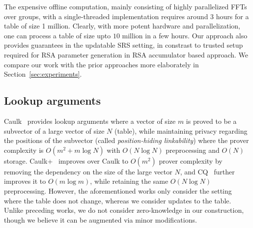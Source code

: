 The expensive offline computation, mainly consisting of highly parallelized FFTs over groups, with a single-threaded implementation requires around $3$ hours for a
table of size 1 million. 
Clearly, with more potent hardware and
parallelization, one can process a table of size upto $10$ million in a few hours. 
Our approach also provides guarantees in the updatable SRS setting, in constrast to trusted setup required for RSA parameter generation in RSA accumulator based approach.
We compare our work with the prior approaches more elaborately in Section~\ref{sec:experiments}.


\subsection{Lookup arguments}

Caulk~\cite{CCS:ZBKMNS22} provides lookup arguments where a vector of size $m$ is proved to be a subvector of a large vector of size $N$ (table), while maintaining privacy regarding the positions of the subvector (called \emph{position-hiding linkability}) where the prover complexity is $O(m^2+m\log N)$ with $O(N\log N)$ preprocessing and $O(N)$ storage. Caulk+~\cite{EPRINT:PosKat22} improves over Caulk to $O(m^2)$ prover complexity by removing the dependency on the size of the large vector $N$, and CQ~\cite{EPRINT:EagFioGab22} further improves it to $O(m\log m)$, while retaining the same $O(N\log N)$ preprocessing. However, the aforementioned works only consider the setting where the table does not change, whereas we consider updates to the table. Unlike preceding works, we do not consider zero-knowledge in our construction, though we believe it can be augmented via minor modifications.

